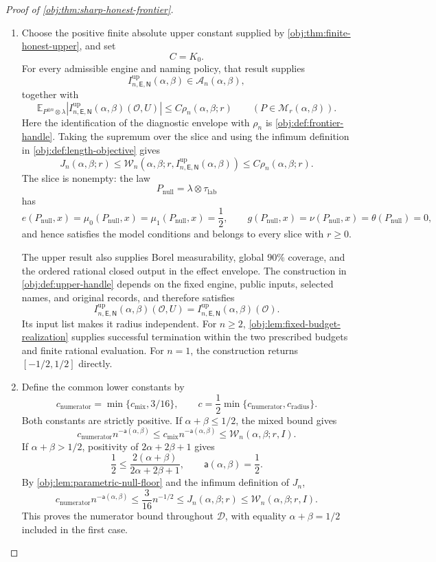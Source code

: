 \begin{proof}[Proof of \cref{obj:thm:sharp-honest-frontier}]
\begin{enumerate}
\item Choose the positive finite absolute upper constant supplied by
\cref{obj:thm:finite-honest-upper}, and set
\[
C=K_0.
\]
For every admissible engine and naming policy, that result supplies
\[
I^{\mathrm{up}}_{n,\mathsf E,\mathsf N}(\alpha,\beta)
\in\mathcal A_n(\alpha,\beta),
\]
together with
\[
\mathbb E_{P^{\otimes n}\otimes\lambda}
\left|I^{\mathrm{up}}_{n,\mathsf E,\mathsf N}(\alpha,\beta)(\mathcal O,U)\right|
\le C\rho_n(\alpha,\beta;r)
\qquad(P\in\mathcal M_r(\alpha,\beta)).
\]
Here the identification of the diagnostic envelope with \(\rho_n\) is
\cref{obj:def:frontier-handle}. Taking the supremum over the slice and using
the infimum definition in \cref{obj:def:length-objective} gives
\[
J_n(\alpha,\beta;r)
\le
\mathcal W_n\!\left(
\alpha,\beta;r,I^{\mathrm{up}}_{n,\mathsf E,\mathsf N}(\alpha,\beta)
\right)
\le C\rho_n(\alpha,\beta;r).
\]
The slice is nonempty: the law
\[
P_{\mathrm{null}}=\lambda\otimes\tau_{\mathrm{lab}}
\]
has
\[
e(P_{\mathrm{null}},x)=\mu_0(P_{\mathrm{null}},x)
=\mu_1(P_{\mathrm{null}},x)=\frac12,
\qquad
g(P_{\mathrm{null}},x)=\nu(P_{\mathrm{null}},x)
=\theta(P_{\mathrm{null}})=0,
\]
and hence satisfies the model conditions and belongs to every slice with
\(r\ge0\).

The upper result also supplies Borel measurability, global \(90\%\) coverage,
and the ordered rational closed output in the effect envelope. The
construction in \cref{obj:def:upper-handle} depends on the fixed engine,
public inputs, selected names, and original records, and therefore satisfies
\[
I^{\mathrm{up}}_{n,\mathsf E,\mathsf N}(\alpha,\beta)(\mathcal O,U)
=
I^{\mathrm{up}}_{n,\mathsf E,\mathsf N}(\alpha,\beta)(\mathcal O).
\]
Its input list makes it radius independent. For \(n\ge2\),
\cref{obj:lem:fixed-budget-realization} supplies successful termination
within the two prescribed budgets and finite rational evaluation. For
\(n=1\), the construction returns \([-1/2,1/2]\) directly.

\item Define the common lower constants by
\[
c_{\mathrm{numerator}}
=\min\{c_{\mathrm{mix}},3/16\},
\qquad
c=\frac12\min\{c_{\mathrm{numerator}},c_{\mathrm{radius}}\}.
\]
Both constants are strictly positive. If \(\alpha+\beta\le1/2\), the mixed
bound gives
\[
c_{\mathrm{numerator}}n^{-\mathsf a(\alpha,\beta)}
\le
c_{\mathrm{mix}}n^{-\mathsf a(\alpha,\beta)}
\le\mathcal W_n(\alpha,\beta;r,I).
\]
If \(\alpha+\beta>1/2\), positivity of \(2\alpha+2\beta+1\) gives
\[
\frac12\le\frac{2(\alpha+\beta)}{2\alpha+2\beta+1},
\qquad
\mathsf a(\alpha,\beta)=\frac12.
\]
By \cref{obj:lem:parametric-null-floor} and the infimum definition of \(J_n\),
\[
c_{\mathrm{numerator}}n^{-\mathsf a(\alpha,\beta)}
\le
\frac3{16}n^{-1/2}
\le J_n(\alpha,\beta;r)
\le\mathcal W_n(\alpha,\beta;r,I).
\]
This proves the numerator bound throughout \(\mathcal D\), with equality
\(\alpha+\beta=1/2\) included in the first case.


\end{enumerate}
\end{proof}
